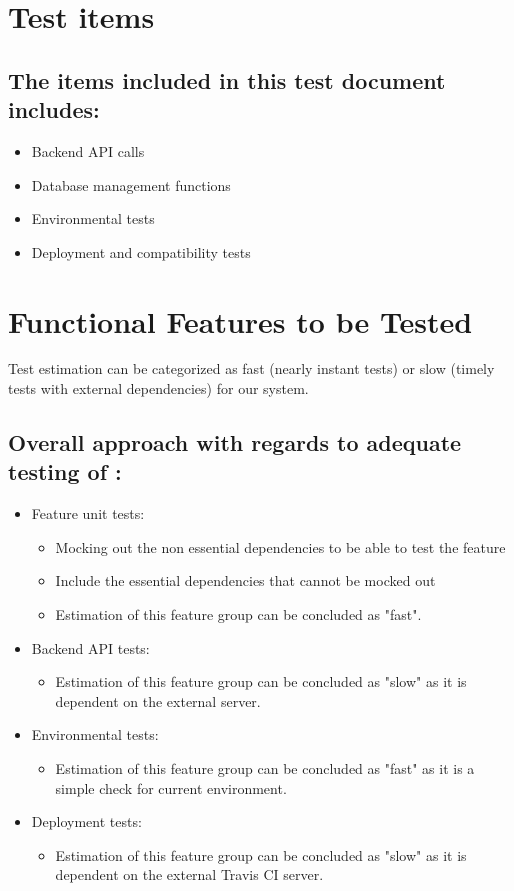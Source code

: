 \documentclass{article}
\begin{document}
\section{Test items}\label{sec:testItems}
\subsection{The items included in this test document includes:}
\begin{itemize}
	\item Backend API calls
	\item Database management functions
	\item Environmental tests 
	\item Deployment and compatibility tests
\end{itemize} 

\section{Functional Features to be Tested}\label{sec:FeaturesTest}
Test estimation can be categorized as fast (nearly instant tests) or slow (timely tests with external dependencies) for our system. \\ 
\subsection{Overall approach with regards to adequate testing of :} 
\begin{itemize}
\item Feature unit tests:
\begin{itemize}
	\item Mocking out the non essential dependencies to be able to test the feature
	\item Include the essential dependencies that cannot be mocked out
	\item Estimation of this feature group can be concluded as "fast".
\end{itemize}
\item Backend API tests:
\begin{itemize}
	\item Estimation of this feature group can be concluded as "slow" as it is dependent on the external server.
\end{itemize}
\item Environmental tests:
\begin{itemize}
	\item Estimation of this feature group can be concluded as "fast" as it is a simple check for current environment.
\end{itemize}
\item Deployment tests:
\begin{itemize}
	\item Estimation of this feature group can be concluded as "slow" as it is dependent on the external Travis CI server.
\end{itemize}
\end{itemize}
\end{document}
